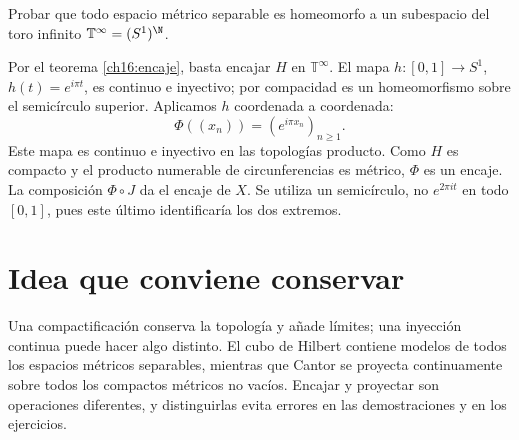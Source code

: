 \begin{ejercicio}
Probar que todo espacio métrico separable es homeomorfo a un subespacio del toro infinito $\mathbb T^\infty=(S^1)^{\N}$.
\end{ejercicio}
\begin{solucion}
Por el teorema \ref{ch16:encaje}, basta encajar $H$ en $\mathbb T^\infty$. El mapa $h:[0,1]\to S^1$, $h(t)=e^{i\pi t}$, es continuo e inyectivo; por compacidad es un homeomorfismo sobre el semicírculo superior. Aplicamos $h$ coordenada a coordenada:
\[
\Phi((x_n))=(e^{i\pi x_n})_{n\ge1}.
\]
Este mapa es continuo e inyectivo en las topologías producto. Como $H$ es compacto y el producto numerable de circunferencias es métrico, $\Phi$ es un encaje. La composición $\Phi\circ J$ da el encaje de $X$. Se utiliza un semicírculo, no $e^{2\pi it}$ en todo $[0,1]$, pues este último identificaría los dos extremos.
\end{solucion}

\section{Idea que conviene conservar}
Una compactificación conserva la topología y añade límites; una inyección continua puede hacer algo distinto. El cubo de Hilbert contiene modelos de todos los espacios métricos separables, mientras que Cantor se proyecta continuamente sobre todos los compactos métricos no vacíos. Encajar y proyectar son operaciones diferentes, y distinguirlas evita errores en las demostraciones y en los ejercicios.
